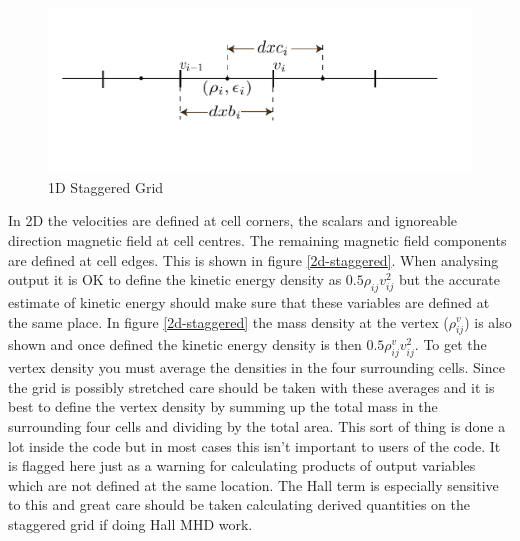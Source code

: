\documentclass[11pt]{article}
\begin{document}
\begin{figure}
\begin{center} 
  \includegraphics{1d-staggered-grid.pdf} 
\caption{1D Staggered Grid}  
\end{center} 
\label{1d-staggered}
\end{figure}

In 2D the velocities are defined at cell corners, the scalars and ignoreable direction magnetic field at cell centres. The remaining magnetic field components are defined at cell edges. This is shown in figure \ref{2d-staggered}. When analysing output it is OK to define the kinetic energy density as $0.5\rho_{ij}v_{ij}^2$ but the accurate estimate of kinetic energy should make sure that these variables are defined at the same place. In figure \ref{2d-staggered} the mass density at the vertex ($\rho_{ij}^v$) is also shown and once defined the kinetic energy density is then  $0.5\rho_{ij}^v v_{ij}^2$. To get the vertex density you must average the densities in the four surrounding cells. Since the grid is possibly stretched care should be taken with these averages and it is best to define the vertex density by summing up the total mass in the surrounding four cells and dividing by the total area. This sort of thing is done a lot inside the code but in most cases this isn't important to users of the code. It is flagged here just as a warning for calculating products of output variables which are not defined at the same location. The Hall term is especially sensitive to this and great care should be taken calculating derived quantities on the staggered grid if doing Hall MHD work.
\end{document}
